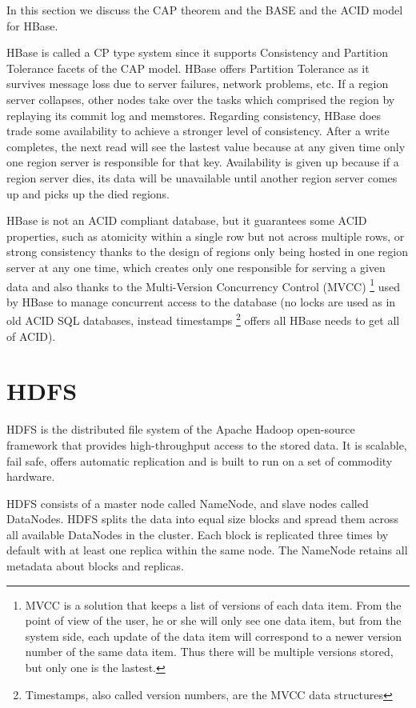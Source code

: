 In this section we discuss the CAP theorem and the BASE and the ACID model for HBase. 
\par
HBase is called a CP type system since it supports Consistency and Partition Tolerance facets of the CAP model.
HBase offers Partition Tolerance as it survives message loss due to server failures, network problems, etc. If a region server collapses, other nodes take over the tasks which comprised the region by replaying its commit log and memstores.
Regarding consistency, HBase does trade some availability to achieve a stronger level of consistency. After a write completes, the next read will see the lastest value because at any given time only one region server is responsible for that key.
Availability is given up because if a region server dies, its data will be unavailable until another region server comes up and picks up the died regions.
\par
HBase is not an ACID compliant database, but it guarantees some ACID properties, such as atomicity within a single row but not across multiple rows, or strong consistency thanks to the design of regions only being hosted in one region server at any one time, which creates only one responsible for serving a given data and also thanks to the Multi-Version Concurrency Control (MVCC) \footnote{MVCC \cite{bernstein1983multiversion} is a solution that keeps a list of versions of each data item. From the point of view of the user, he or she will only see one data item, but from the system side, each update of the data item will correspond to a newer version number of the same data item. Thus there will be multiple versions stored, but only one is the lastest.} used by HBase to manage concurrent access to the database (no locks are used as in old ACID SQL databases, instead timestamps \footnote{Timestamps, also called version numbers, are the MVCC data structures} offers all HBase needs to get all of ACID).



\section{HDFS}
HDFS is the distributed file system of the Apache Hadoop open-source framework that provides high-throughput access to the stored data. It is scalable, fail safe, offers automatic replication and is built to run on a set of commodity hardware.
\par
HDFS consists of a master node called NameNode, and slave nodes called DataNodes. HDFS splits the data into equal size blocks and spread them across all available DataNodes in the cluster. Each block is replicated three times by default with at least one replica within the same node. The NameNode retains all metadata about blocks and replicas.

